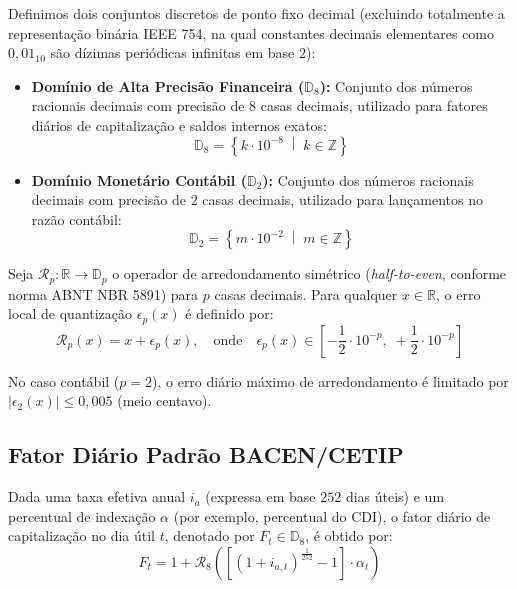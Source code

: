 \documentclass[11pt, a4paper]{article}
\begin{document}
Definimos dois conjuntos discretos de ponto fixo decimal (excluindo totalmente a representação binária IEEE 754, na qual constantes decimais elementares como $0{,}01_{10}$ são dízimas periódicas infinitas em base $2$):
\begin{itemize}
    \item \textbf{Domínio de Alta Precisão Financeira ($\mathbb{D}_8$):} Conjunto dos números racionais decimais com precisão de $8$ casas decimais, utilizado para fatores diários de capitalização e saldos internos exatos:
    \begin{equation}
        \mathbb{D}_8 = \left\{ k \cdot 10^{-8} \;\middle|\; k \in \mathbb{Z} \right\}
    \end{equation}
    \item \textbf{Domínio Monetário Contábil ($\mathbb{D}_2$):} Conjunto dos números racionais decimais com precisão de $2$ casas decimais, utilizado para lançamentos no razão contábil:
    \begin{equation}
        \mathbb{D}_2 = \left\{ m \cdot 10^{-2} \;\middle|\; m \in \mathbb{Z} \right\}
    \end{equation}
\end{itemize}

Seja $\mathcal{R}_p : \mathbb{R} \to \mathbb{D}_p$ o operador de arredondamento simétrico (\textit{half-to-even}, conforme norma ABNT NBR 5891) para $p$ casas decimais. Para qualquer $x \in \mathbb{R}$, o erro local de quantização $\epsilon_p(x)$ é definido por:
\begin{equation}
    \mathcal{R}_p(x) = x + \epsilon_p(x), \quad \text{onde} \quad \epsilon_p(x) \in \left[- \frac{1}{2} \cdot 10^{-p},\; + \frac{1}{2} \cdot 10^{-p}\right]
\end{equation}

No caso contábil ($p = 2$), o erro diário máximo de arredondamento é limitado por $|\epsilon_2(x)| \le 0{,}005$ (meio centavo).

\subsection{Fator Diário Padrão BACEN/CETIP}

Dada uma taxa efetiva anual $i_a$ (expressa em base $252$ dias úteis) e um percentual de indexação $\alpha$ (por exemplo, percentual do CDI), o fator diário de capitalização no dia útil $t$, denotado por $F_t \in \mathbb{D}_8$, é obtido por:
\begin{equation}
    F_t = 1 + \mathcal{R}_8 \left( \left[ (1 + i_{a,t})^{\frac{1}{252}} - 1 \right] \cdot \alpha_t \right)
\end{equation}
\end{document}
